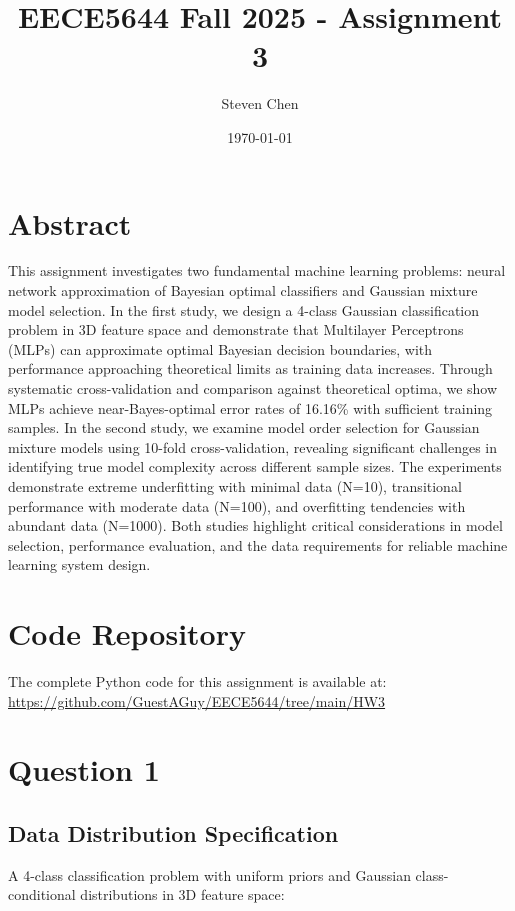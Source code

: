 \documentclass[12pt]{article}
\title{EECE5644 Fall 2025 - Assignment 3}
\author{Steven Chen}
\date{\today}
\begin{document}
\maketitle

\section*{Abstract}
This assignment investigates two fundamental machine learning problems: neural network approximation of Bayesian optimal classifiers and Gaussian mixture model selection. In the first study, we design a 4-class Gaussian classification problem in 3D feature space and demonstrate that Multilayer Perceptrons (MLPs) can approximate optimal Bayesian decision boundaries, with performance approaching theoretical limits as training data increases. Through systematic cross-validation and comparison against theoretical optima, we show MLPs achieve near-Bayes-optimal error rates of 16.16\% with sufficient training samples. In the second study, we examine model order selection for Gaussian mixture models using 10-fold cross-validation, revealing significant challenges in identifying true model complexity across different sample sizes. The experiments demonstrate extreme underfitting with minimal data (N=10), transitional performance with moderate data (N=100), and overfitting tendencies with abundant data (N=1000). Both studies highlight critical considerations in model selection, performance evaluation, and the data requirements for reliable machine learning system design.

\section*{Code Repository}
The complete Python code for this assignment is available at: \\
\url{https://github.com/GuestAGuy/EECE5644/tree/main/HW3}

\newpage

\section*{Question 1}

\subsection{Data Distribution Specification}
A 4-class classification problem with uniform priors and Gaussian class-conditional distributions in 3D feature space:
\end{document}
